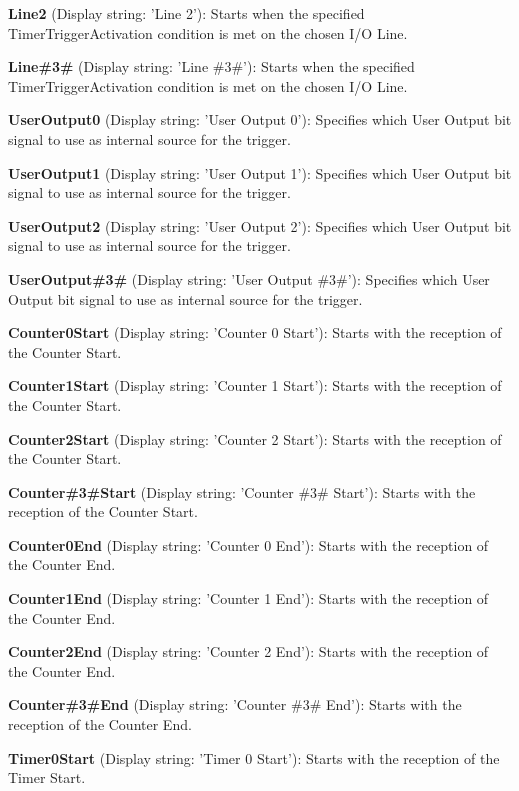 \begin{DoxyItemize}
\item {\bfseries Line2} (Display string\+: 'Line 2')\+: Starts when the specified Timer\+Trigger\+Activation condition is met on the chosen I/\+O Line.
\item {\bfseries Line\#3\#} (Display string\+: 'Line \#3\#')\+: Starts when the specified Timer\+Trigger\+Activation condition is met on the chosen I/\+O Line.
\item {\bfseries User\+Output0} (Display string\+: 'User Output 0')\+: Specifies which User Output bit signal to use as internal source for the trigger.
\item {\bfseries User\+Output1} (Display string\+: 'User Output 1')\+: Specifies which User Output bit signal to use as internal source for the trigger.
\item {\bfseries User\+Output2} (Display string\+: 'User Output 2')\+: Specifies which User Output bit signal to use as internal source for the trigger.
\item {\bfseries User\+Output\#3\#} (Display string\+: 'User Output \#3\#')\+: Specifies which User Output bit signal to use as internal source for the trigger.
\item {\bfseries Counter0\+Start} (Display string\+: 'Counter 0 Start')\+: Starts with the reception of the Counter Start.
\item {\bfseries Counter1\+Start} (Display string\+: 'Counter 1 Start')\+: Starts with the reception of the Counter Start.
\item {\bfseries Counter2\+Start} (Display string\+: 'Counter 2 Start')\+: Starts with the reception of the Counter Start.
\item {\bfseries Counter\#3\#Start} (Display string\+: 'Counter \#3\# Start')\+: Starts with the reception of the Counter Start.
\item {\bfseries Counter0\+End} (Display string\+: 'Counter 0 End')\+: Starts with the reception of the Counter End.
\item {\bfseries Counter1\+End} (Display string\+: 'Counter 1 End')\+: Starts with the reception of the Counter End.
\item {\bfseries Counter2\+End} (Display string\+: 'Counter 2 End')\+: Starts with the reception of the Counter End.
\item {\bfseries Counter\#3\#End} (Display string\+: 'Counter \#3\# End')\+: Starts with the reception of the Counter End.
\item {\bfseries Timer0\+Start} (Display string\+: 'Timer 0 Start')\+: Starts with the reception of the Timer Start.

\end{DoxyItemize}
